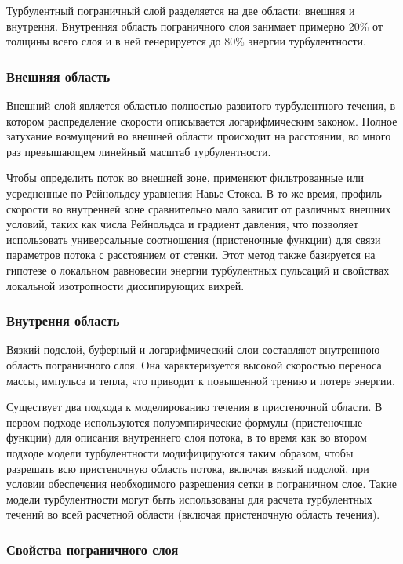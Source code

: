 \documentclass[a4paper]{article}
\begin{document}
		Турбулентный пограничный слой разделяется на две области: внешняя и внутрення. Внутренняя область пограничного слоя занимает примерно 20\% от толщины всего слоя и в ней генерируется до 80\% энергии турбулентности.
		
	\subsubsection{Внешняя область}
		
		Внешний слой является областью полностью развитого турбулентного течения, в котором распределение скорости описывается логарифмическим законом. Полное затухание возмущений во внешней области происходит на расстоянии, во много раз превышающем линейный масштаб турбулентности.
		
		Чтобы определить поток во внешней зоне, применяют фильтрованные или усредненные по Рейнольдсу уравнения Навье-Стокса. В то же время, профиль скорости во внутренней зоне сравнительно мало зависит от различных внешних условий, таких как числа Рейнольдса и градиент давления, что позволяет использовать универсальные соотношения (пристеночные функции) для связи параметров потока с расстоянием от стенки. Этот метод также базируется на гипотезе о локальном равновесии энергии турбулентных пульсаций и свойствах локальной изотропности диссипирующих вихрей.
		
	\subsubsection{Внутрення область}
	
		Вязкий подслой, буферный и логарифмический слои составляют внутреннюю область пограничного слоя. Она характеризуется высокой скоростью переноса массы, импульса и тепла, что приводит к повышенной трению и потере энергии.
		
		Существует два подхода к моделированию течения в пристеночной области. В первом подходе используются полуэмпирические формулы (пристеночные функции) для описания внутреннего слоя потока, в то время как во втором подходе модели турбулентности модифицируются таким образом, чтобы разрешать всю пристеночную область потока, включая вязкий подслой, при условии обеспечения необходимого разрешения сетки в пограничном слое. Такие модели турбулентности могут быть использованы для расчета турбулентных течений во всей расчетной области (включая пристеночную область течения).
		
	\subsubsection{Свойства пограничного слоя}
	
\end{document}
